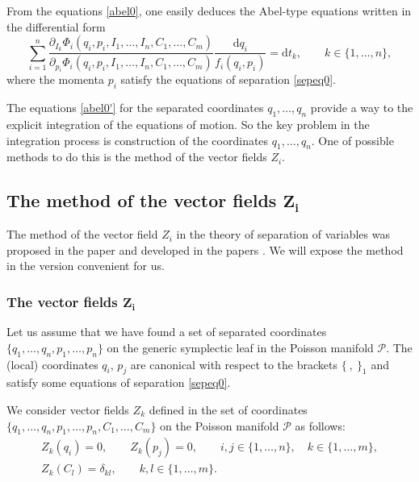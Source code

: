 \documentclass[pdftex]{sigma}
\def\d{\delta}
\numberwithin{equation}{section}
\begin{document}
From the equations \eqref{abel0}, one easily deduces the Abel-type equations written in the differential form
\begin{equation}\label{abel0'}
\sum\limits_{i=1}^n \frac{ {\partial_{I_k} \Phi_i(q_i, p_i, I_1, \dots ,I_n, C_1, \dots ,C_m)} }{ {\partial_{p_i} \Phi_i(q_i, p_i ,I_1, \dots ,I_n, C_1, \dots ,C_m)}} \frac{\mathrm{d} q_i}{ f_i(q_i,p_i)} = \mathrm{d} t_k, \qquad k\in \{1, \dots, n\},
\end{equation}
where the momenta $p_i$ satisfy the equations of separation \eqref{sepeq0}.

The equations \eqref{abel0'} for the separated coordinates $q_1, \dots , q_n$ provide a
way to the explicit integration of the equations of motion. So the key problem in the integration process is construction of the coordinates $q_1, \dots, q_n$.
 One of possible methods to do this is the
 method of the vector fields $Z_i$.

\subsection[The method of the vector fields Z\_i]{The method of the vector fields $\boldsymbol{Z_i}$}

The method of the vector field $Z_i$ in the theory of separation
of variables was proposed in the paper
 \cite{MFP} and developed in the papers \cite{FP, FP2}. We will expose the
method in the version convenient for us.

\subsubsection[The vector fields Z\_i]{The vector fields $\boldsymbol{Z_i}$}
Let us assume that we have found a set of separated coordinates
$\{q_1, \dots , q_n, p_1, \dots , p_n\}$ on the generic symplectic leaf
in the Poisson manifold $\mathcal{P}$. The (local) coordinates $q_i$,
$p_j$ are canonical with respect to the brackets $\{ \ , \ \}_1$
 and satisfy some equations of separation \eqref{sepeq0}.

 We consider vector fields $Z_k$ defined in the set of coordinates $\{q_1, \dots , q_n,
p_1, \dots , p_n, C_1, \dots ,\allowbreak C_m\}$ on the Poisson manifold
$\mathcal{P}$ as follows:
\begin{subequations}\label{defZ}
\begin{gather}
Z_k(q_i)=0, \qquad Z_k(p_j)=0, \qquad i,j\in \{1, \dots, n\}, \quad k\in
\{1, \dots, m\},\label{defZ1}
\\
 Z_k(C_l)=\d_{kl}, \qquad k,l\in \{1, \dots ,m \}.\label{defZ2}
\end{gather}
\end{subequations}
\end{document}

